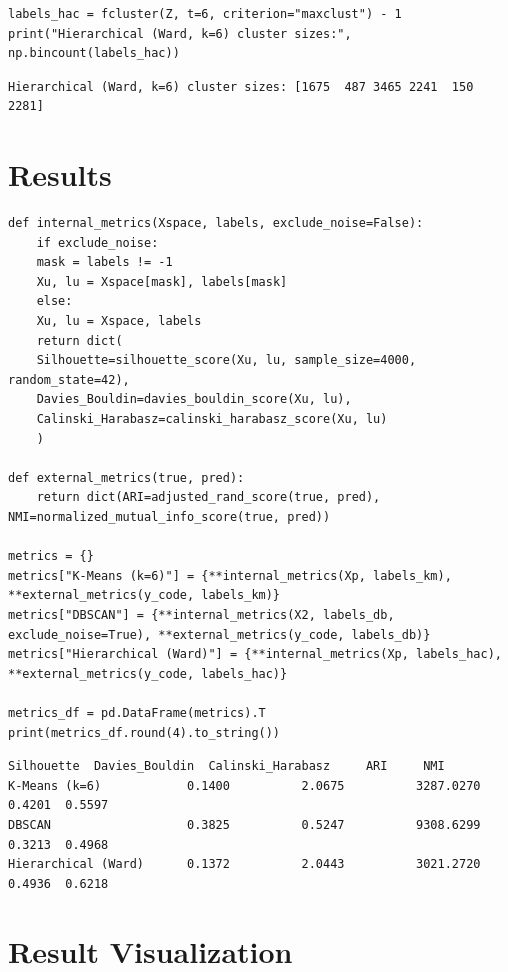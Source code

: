 \documentclass[12pt,a4paper]{article}
\begin{document}
\url{}

\begin{verbatim}
labels_hac = fcluster(Z, t=6, criterion="maxclust") - 1
print("Hierarchical (Ward, k=6) cluster sizes:", np.bincount(labels_hac))
\end{verbatim}

\begin{verbatim}
Hierarchical (Ward, k=6) cluster sizes: [1675  487 3465 2241  150 2281]
\end{verbatim}

\section{Results}
\label{sec:org93cbe2e}

\begin{verbatim}
def internal_metrics(Xspace, labels, exclude_noise=False):
    if exclude_noise:
	mask = labels != -1
	Xu, lu = Xspace[mask], labels[mask]
    else:
	Xu, lu = Xspace, labels
    return dict(
	Silhouette=silhouette_score(Xu, lu, sample_size=4000, random_state=42),
	Davies_Bouldin=davies_bouldin_score(Xu, lu),
	Calinski_Harabasz=calinski_harabasz_score(Xu, lu)
    )

def external_metrics(true, pred):
    return dict(ARI=adjusted_rand_score(true, pred), NMI=normalized_mutual_info_score(true, pred))

metrics = {}
metrics["K-Means (k=6)"] = {**internal_metrics(Xp, labels_km), **external_metrics(y_code, labels_km)}
metrics["DBSCAN"] = {**internal_metrics(X2, labels_db, exclude_noise=True), **external_metrics(y_code, labels_db)}
metrics["Hierarchical (Ward)"] = {**internal_metrics(Xp, labels_hac), **external_metrics(y_code, labels_hac)}

metrics_df = pd.DataFrame(metrics).T
print(metrics_df.round(4).to_string())
\end{verbatim}

\begin{verbatim}
Silhouette  Davies_Bouldin  Calinski_Harabasz     ARI     NMI
K-Means (k=6)            0.1400          2.0675          3287.0270  0.4201  0.5597
DBSCAN                   0.3825          0.5247          9308.6299  0.3213  0.4968
Hierarchical (Ward)      0.1372          2.0443          3021.2720  0.4936  0.6218
\end{verbatim}

\section{Result Visualization}
\label{sec:org49c99c5}
\end{document}
